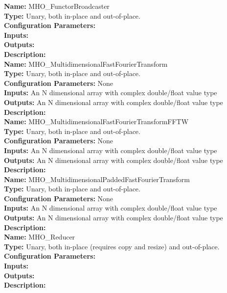 \noindent \textbf{Name:}  MHO\_FunctorBroadcaster \\
\textbf{Type:} Unary, both in-place and out-of-place. \\
\textbf{Configuration Parameters:} \\
\textbf{Inputs:} \\
\textbf{Outputs:} \\
\textbf{Description:} \\


\noindent \textbf{Name:} MHO\_MultidimensionalFastFourierTransform \\
\textbf{Type:} Unary, both in-place and out-of-place. \\
\textbf{Configuration Parameters:} None\\
\textbf{Inputs:} An N dimensional array with complex double/float value type \\
\textbf{Outputs:} An N dimensional array with complex double/float value type \\
\textbf{Description:} \\


\noindent \textbf{Name:} MHO\_MultidimensionalFastFourierTransformFFTW \\
\textbf{Type:} Unary, both in-place and out-of-place. \\
\textbf{Configuration Parameters:} None\\
\textbf{Inputs:} An N dimensional array with complex double/float value type \\
\textbf{Outputs:} An N dimensional array with complex double/float value type \\
\textbf{Description:} \\


\noindent \textbf{Name:} MHO\_MultidimensionalPaddedFastFourierTransform \\
\textbf{Type:} Unary, both in-place and out-of-place. \\
\textbf{Configuration Parameters:} None\\
\textbf{Inputs:} An N dimensional array with complex double/float value type \\
\textbf{Outputs:} An N dimensional array with complex double/float value type \\
\textbf{Description:} \\


\noindent \textbf{Name:} MHO\_Reducer  \\
\textbf{Type:} Unary, both in-place (requires copy and resize) and out-of-place. \\
\textbf{Configuration Parameters:} \\
\textbf{Inputs:} \\
\textbf{Outputs:} \\
\textbf{Description:} \\



